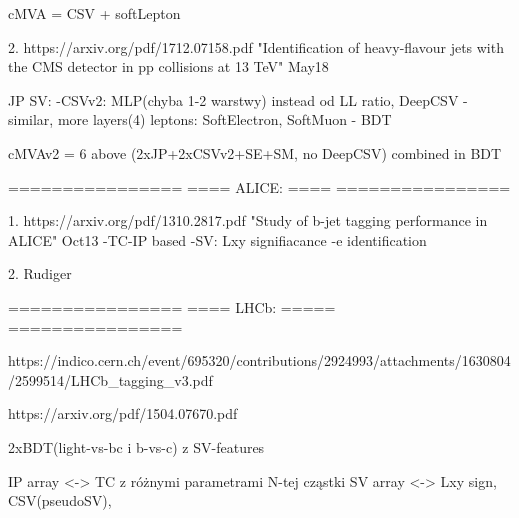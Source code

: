 cMVA = CSV + softLepton

2.
https://arxiv.org/pdf/1712.07158.pdf
"Identification of heavy-flavour jets with the CMS detector in pp collisions at 13 TeV" May18

JP
SV:
-CSVv2: MLP(chyba 1-2 warstwy) instead od LL ratio, DeepCSV - similar, more layers(4)
leptons:
SoftElectron, SoftMuon - BDT

cMVAv2 = 6 above (2xJP+2xCSVv2+SE+SM, no DeepCSV) combined in BDT



================
==== ALICE: ====
================

1.
https://arxiv.org/pdf/1310.2817.pdf
"Study of b-jet tagging performance in ALICE" Oct13
-TC-IP based
-SV: Lxy signifiacance
-e identification

2. Rudiger



================
==== LHCb: =====
================


https://indico.cern.ch/event/695320/contributions/2924993/attachments/1630804/2599514/LHCb_tagging_v3.pdf

https://arxiv.org/pdf/1504.07670.pdf

2xBDT(light-vs-bc i b-vs-c) z SV-features





IP array  <-> TC z różnymi parametrami N-tej cząstki
SV array <-> Lxy sign, CSV(pseudoSV), 